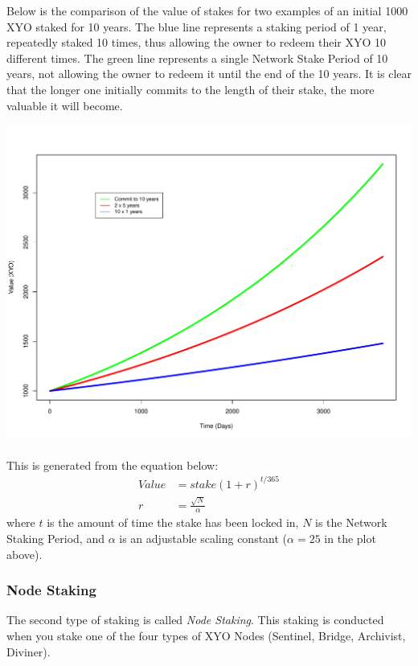 \documentclass{article}
\begin{document}
Below is the comparison of the value of stakes for two examples of an initial 1000 XYO staked for 10 years. The blue line represents a staking period of 1 year, repeatedly staked 10 times, thus allowing the owner to redeem their XYO 10 different times. The green line represents a single Network Stake Period of 10 years, not allowing the owner to redeem it until the end of the 10 years. It is clear that the longer one initially commits to the length of their stake, the more valuable it will become.

\includegraphics[width=\textwidth]{StakingAlgorithm.pdf}
\\\\

This is generated from the equation below:
\begin{align}
    Value &= stake(1+r)^{t/365}\\
    r &= \frac{\sqrt{N}}{\alpha}
\end{align}
where $t$ is the amount of time the stake has been locked in, $N$ is the Network Staking Period, and $\alpha$ is an adjustable scaling constant ($\alpha = 25$ in the plot above).

\subsubsection{Node Staking}

The second type of staking is called \textit{Node Staking}. This staking is conducted when you stake one of the four types of XYO Nodes (Sentinel, Bridge, Archivist, Diviner).\\ 
\end{document}
